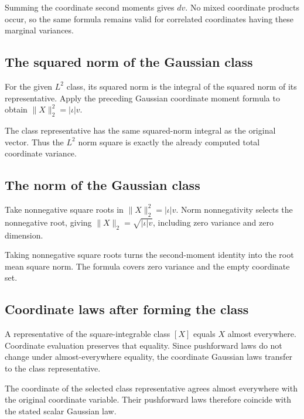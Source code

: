 \documentclass[11pt,a4paper]{article}
\begin{document}
Summing the coordinate second moments gives \(dv\). No mixed coordinate products occur, so the same formula remains valid for correlated coordinates having these marginal variances.


\subsection{\texorpdfstring{The squared norm of the Gaussian class}{The squared norm of the Gaussian class}}


For the given \(L^2\) class, its squared norm is the integral of the squared norm of its representative. Apply the preceding Gaussian coordinate moment formula to obtain \(\|X\|_2^2=|\iota|v\).



The class representative has the same squared-norm integral as the original vector. Thus the \(L^2\) norm square is exactly the already computed total coordinate variance.


\subsection{\texorpdfstring{The norm of the Gaussian class}{The norm of the Gaussian class}}


Take nonnegative square roots in \(\|X\|_2^2=|\iota|v\). Norm nonnegativity selects the nonnegative root, giving \(\|X\|_2=\sqrt{|\iota|v}\), including zero variance and zero dimension.



Taking nonnegative square roots turns the second-moment identity into the root mean square norm. The formula covers zero variance and the empty coordinate set.


\subsection{\texorpdfstring{Coordinate laws after forming the class}{Coordinate laws after forming the class}}


A representative of the square-integrable class \([X]\) equals \(X\) almost everywhere. Coordinate evaluation preserves that equality. Since pushforward laws do not change under almost-everywhere equality, the coordinate Gaussian laws transfer to the class representative.



The coordinate of the selected class representative agrees almost everywhere with the original coordinate variable. Their pushforward laws therefore coincide with the stated scalar Gaussian law.
\end{document}
